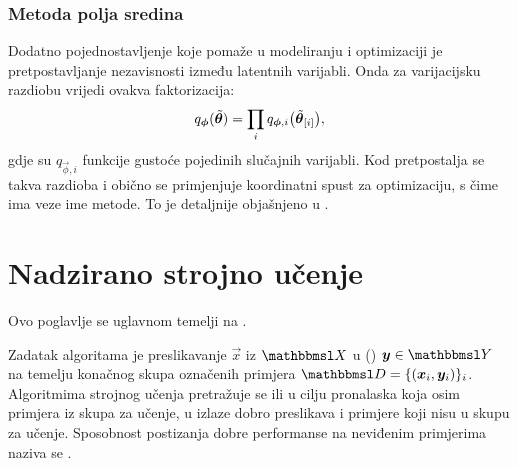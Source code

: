 \documentclass[utf8, diplomski, lmodern]{fer}
\begin{document}
\subsection{Metoda polja sredina}

Dodatno pojednostavljenje koje pomaže u modeliranju i optimizaciji je pretpostavljanje nezavisnosti između latentnih varijabli. Onda za varijacijsku razdiobu vrijedi ovakva faktorizacija:
\begin{align}
q_{\vec\phi}\del{\tilde{\vec\theta}} = \prod_i q_{\vec\phi,i}\del{\tilde{\vec\theta}_\ind{i}},
\end{align}
gdje su $q_{\vec\phi,i}$ funkcije gustoće pojedinih slučajnih varijabli. Kod  pretpostalja se takva razdioba i obično se primjenjuje koordinatni spust za optimizaciju, s čime ima veze ime metode. To je detaljnije objašnjeno u \citet{Murphy:2012:MLPP}.

\iffalse
Neka je, radi kraćeg zapisa, $t\del{\tilde{\vec\theta}} \coloneqq \p(\rvec\theta=\tilde{\vec\theta},\rvec x=\vec x)$. Uz aproksimaciju polja sredina donja varijacijska granica postaje
\begin{align}
L_{\vec x}\del{\tilde{\rvec\theta}} 
&= \E_{\tilde{\vec\theta}\sim q_{\vec\phi}}\del{\ln t\del{\tilde{\vec\theta}} - \ln q\del{\tilde{\vec\theta}}}
\\
&= \int\dif{\tilde{\vec\theta}} \del{\prod_i q_i(\tilde{z}_i)}\del{\ln t\del{\tilde{\vec\theta}} - \sum_j \ln q_j(\tilde{z}_j)}
\text{.}
\end{align}
\fi



\chapter{Nadzirano strojno učenje} \label{chap:nadzirano-strojno-ucenje}

Ovo poglavlje se uglavnom temelji na \citet{Snajder:2014:SU,Goodfellow:2016:DL}.

Zadatak algoritama  je preslikavanje  $\vec x$ iz  $\set{X}$ u  () $\vec y\in\set{Y}$ na temelju konačnog skupa označenih primjera $\set{D} = \cbr{\del{\vec x_i,\vec y_i}}_{i}$. Algoritmima strojnog učenja pretražuje se  ili  u cilju pronalaska  koja osim primjera iz skupa za učenje, u izlaze dobro preslikava i primjere koji nisu u skupu za učenje. Sposobnost postizanja dobre performanse na neviđenim primjerima naziva se .
\end{document}
